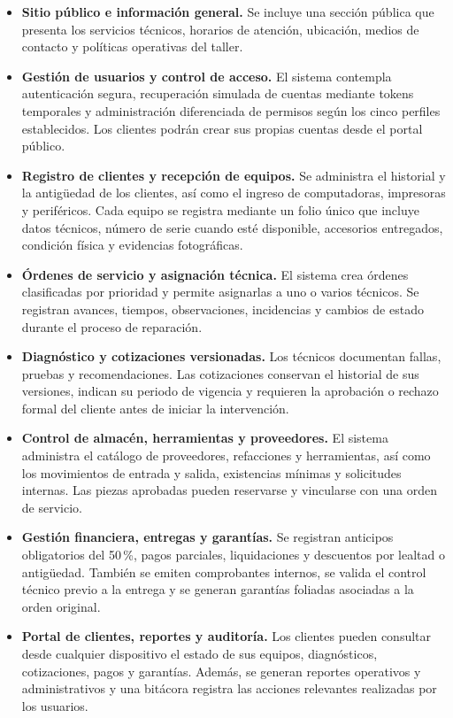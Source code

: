 \begin{itemize}
    \item \textbf{Sitio público e información general.} Se incluye una sección pública que presenta los servicios técnicos, horarios de atención, ubicación, medios de contacto y políticas operativas del taller.

    \item \textbf{Gestión de usuarios y control de acceso.} El sistema contempla autenticación segura, recuperación simulada de cuentas mediante tokens temporales y administración diferenciada de permisos según los cinco perfiles establecidos. Los clientes podrán crear sus propias cuentas desde el portal público.

    \item \textbf{Registro de clientes y recepción de equipos.} Se administra el historial y la antigüedad de los clientes, así como el ingreso de computadoras, impresoras y periféricos. Cada equipo se registra mediante un folio único que incluye datos técnicos, número de serie cuando esté disponible, accesorios entregados, condición física y evidencias fotográficas.

    \item \textbf{Órdenes de servicio y asignación técnica.} El sistema crea órdenes clasificadas por prioridad y permite asignarlas a uno o varios técnicos. Se registran avances, tiempos, observaciones, incidencias y cambios de estado durante el proceso de reparación.

    \item \textbf{Diagnóstico y cotizaciones versionadas.} Los técnicos documentan fallas, pruebas y recomendaciones. Las cotizaciones conservan el historial de sus versiones, indican su periodo de vigencia y requieren la aprobación o rechazo formal del cliente antes de iniciar la intervención.

    \item \textbf{Control de almacén, herramientas y proveedores.} El sistema administra el catálogo de proveedores, refacciones y herramientas, así como los movimientos de entrada y salida, existencias mínimas y solicitudes internas. Las piezas aprobadas pueden reservarse y vincularse con una orden de servicio.

    \item \textbf{Gestión financiera, entregas y garantías.} Se registran anticipos obligatorios del 50\,\%, pagos parciales, liquidaciones y descuentos por lealtad o antigüedad. También se emiten comprobantes internos, se valida el control técnico previo a la entrega y se generan garantías foliadas asociadas a la orden original.

    \item \textbf{Portal de clientes, reportes y auditoría.} Los clientes pueden consultar desde cualquier dispositivo el estado de sus equipos, diagnósticos, cotizaciones, pagos y garantías. Además, se generan reportes operativos y administrativos y una bitácora registra las acciones relevantes realizadas por los usuarios.
\end{itemize}


